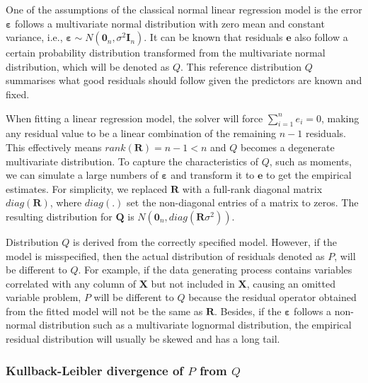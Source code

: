 \documentclass[]{interact}
\theoremstyle{plain}%
\theoremstyle{definition}
\theoremstyle{remark}
\begin{document}
One of the assumptions of the classical normal linear regression model
is the error \(\boldsymbol{\varepsilon}\) follows a multivariate normal
distribution with zero mean and constant variance, i.e.,
\(\boldsymbol{\varepsilon} \sim N(\boldsymbol{0}_n,\sigma^2\boldsymbol{I}_n)\).
It can be known that residuals \(\boldsymbol{e}\) also follow a certain
probability distribution transformed from the multivariate normal
distribution, which will be denoted as \(Q\). This reference
distribution \(Q\) summarises what good residuals should follow given
the predictors are known and fixed.

When fitting a linear regression model, the solver will force
\(\sum_{i=1}^{n} e_i = 0\), making any residual value to be a linear
combination of the remaining \(n - 1\) residuals. This effectively means
\(rank(\boldsymbol{R}) = n - 1 < n\) and \(Q\) becomes a degenerate
multivariate distribution. To capture the characteristics of \(Q\), such
as moments, we can simulate a large numbers of
\(\boldsymbol{\varepsilon}\) and transform it to \(\boldsymbol{e}\) to
get the empirical estimates. For simplicity, we replaced
\(\boldsymbol{R}\) with a full-rank diagonal matrix
\(diag(\boldsymbol{R})\), where \(diag(.)\) set the non-diagonal entries
of a matrix to zeros. The resulting distribution for \(\boldsymbol{Q}\)
is \(N(\boldsymbol{0}_n, diag(\boldsymbol{R}\sigma^2))\).

Distribution \(Q\) is derived from the correctly specified model.
However, if the model is misspecified, then the actual distribution of
residuals denoted as \(P\), will be different to \(Q\). For example, if
the data generating process contains variables correlated with any
column of \(\boldsymbol{X}\) but not included in \(\boldsymbol{X}\),
causing an omitted variable problem, \(P\) will be different to \(Q\)
because the residual operator obtained from the fitted model will not be
the same as \(\boldsymbol{R}\). Besides, if the
\(\boldsymbol{\varepsilon}\) follows a non-normal distribution such as a
multivariate lognormal distribution, the empirical residual distribution
will usually be skewed and has a long tail.

\hypertarget{kullback-leibler-divergence-of-p-from-q}{%
\subsubsection{\texorpdfstring{Kullback-Leibler divergence of \(P\) from
\(Q\)}{Kullback-Leibler divergence of P from Q}}\label{kullback-leibler-divergence-of-p-from-q}}
\end{document}
